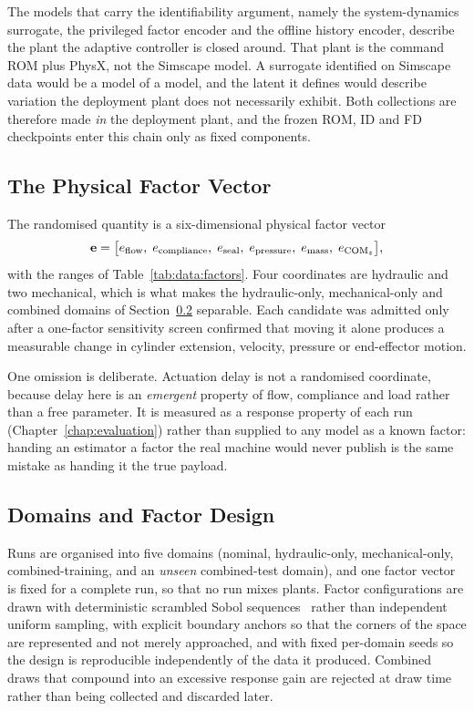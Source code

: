 The models that carry the identifiability argument, namely the system-dynamics
surrogate, the privileged factor encoder and the offline history encoder,
describe the plant the adaptive controller is closed around. That plant is the
command ROM plus PhysX, not the Simscape model. A surrogate identified on
Simscape data would be a model of a model, and the latent it defines would
describe variation the deployment plant does not necessarily exhibit. Both
collections are therefore made \emph{in} the deployment plant, and the frozen
ROM, ID and FD checkpoints enter this chain only as fixed components.

\subsection{The Physical Factor Vector}
\label{sec:data:factors}

The randomised quantity is a six-dimensional physical factor vector
%
\begin{equation}
  \label{eq:data:factorvec}
  \factorvec = \bigl[
    e_{\mathrm{flow}},\;
    e_{\mathrm{compliance}},\;
    e_{\mathrm{seal}},\;
    e_{\mathrm{pressure}},\;
    e_{\mathrm{mass}},\;
    e_{\mathrm{COM}_z}
  \bigr],
\end{equation}
%
with the ranges of Table~\ref{tab:data:factors}. Four coordinates are hydraulic
and two mechanical, which is what makes the hydraulic-only, mechanical-only and
combined domains of Section~\ref{sec:data:domains} separable. Each candidate was
admitted only after a one-factor sensitivity screen confirmed that moving it
alone produces a measurable change in cylinder extension, velocity, pressure or
end-effector motion.

One omission is deliberate. Actuation delay is not a randomised coordinate,
because delay here is an \emph{emergent} property of flow, compliance and load
rather than a free parameter. It is measured as a response property of each run
(Chapter~\ref{chap:evaluation}) rather than supplied to any model as a known
factor: handing an estimator a factor the real machine would never publish is
the same mistake as handing it the true payload.

\subsection{Domains and Factor Design}
\label{sec:data:domains}

Runs are organised into five domains
(nominal, hydraulic-only, mechanical-only, combined-training, and an
\emph{unseen} combined-test domain), and one factor vector is fixed for a complete run, so that no
run mixes plants. Factor configurations are drawn with deterministic
scrambled Sobol sequences~\cite{sobol1967distribution} rather than
independent uniform sampling, with explicit boundary anchors so that the
corners of the space are represented and not merely approached, and with
fixed per-domain seeds so the design is reproducible independently of
the data it produced. Combined draws that compound into an excessive
response gain are rejected at draw time rather than being collected and
discarded later.

